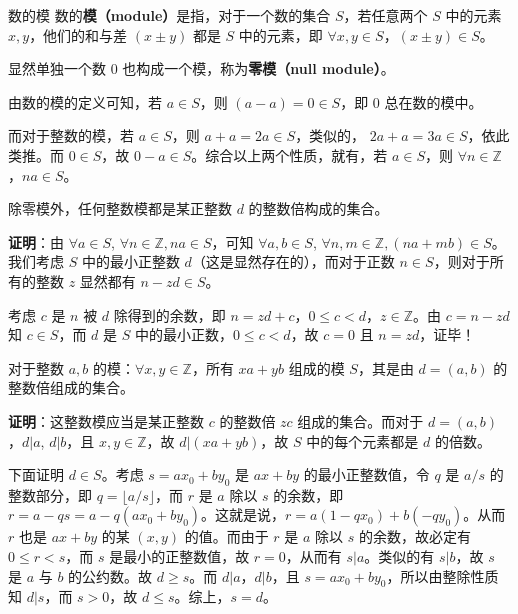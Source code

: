 \begin{definition}{数的模}
数的\textbf{模（module）}是指，对于一个数的集合 $S$，若任意两个 $S$ 中的元素 $x, y$，他们的和与差 $(x\pm y)$ 都是 $S$ 中的元素，即 $\forall x, y \in S$，$(x \pm y) \in S$。
\end{definition}
显然单独一个数 $0$ 也构成一个模，称为\textbf{零模（null module）}。

由数的模的定义可知，若 $a \in S$，则 $(a-a)=0 \in S$，即 $0$ 总在数的模中。

而对于整数的模，若 $a \in S$，则 $a + a = 2a\in S$，类似的， $2a + a = 3a\in S$，依此类推。而 $0 \in S$，故 $0 - a \in S$。综合以上两个性质，就有，若 $a \in S$，则 $\forall n \in \mathbb Z$，$na \in S$。

\begin{theorem}{}
除零模外，任何整数模都是某正整数 $d$ 的整数倍构成的集合。
\end{theorem}
\textbf{证明}：由 $\forall a \in S$, $\forall n \in \mathbb Z, na \in S$，可知 $\forall a, b \in S$, $\forall n, m \in \mathbb Z, (na+mb) \in S$。我们考虑 $S$ 中的最小正整数 $d$（这是显然存在的），而对于正数 $n \in S$，则对于所有的整数 $z$ 显然都有 $n - zd \in S$。

考虑 $c$ 是 $n$ 被 $d$ 除得到的余数，即 $n = zd + c$，$0 \le c < d$，$z \in \mathbb Z$。由 $c = n - zd$ 知 $c \in S$，而 $d$ 是 $S$ 中的最小正数，$0 \le c < d$，故 $c = 0$ 且 $n = zd$，证毕！

\begin{theorem}{}
对于整数 $a, b$ 的模：$\forall x, y \in \mathbb Z$，所有 $xa+yb$ 组成的模 $S$，其是由 $d=(a, b)$ 的整数倍组成的集合。
\end{theorem}
\textbf{证明}：这整数模应当是某正整数 $c$ 的整数倍 $zc$ 组成的集合。而对于 $d = (a, b)$，$d | a$, $d | b$，且 $x, y \in \mathbb Z$，故 $d | (xa+yb)$，故 $S$ 中的每个元素都是 $d$ 的倍数。

下面证明 $d \in S$。考虑 $s=a x_0 + b y_0$ 是 $ax+by$ 的最小正整数值，令 $q$ 是 $a/s$ 的整数部分，即 $q = \lfloor a/s \rfloor$，而 $r$ 是 $a$ 除以 $s$ 的余数，即 $r = a - q s = a - q(a x_0 + b y_0)$。这就是说，$r = a(1-q x_0) + b(-q y_0)$。从而 $r$ 也是 $ax+by$ 的某 $(x, y)$ 的值。而由于 $r$ 是 $a$ 除以 $s$ 的余数，故必定有 $0 \le r < s$，而 $s$ 是最小的正整数值，故 $r=0$，从而有 $s | a$。类似的有 $s | b$，故 $s$ 是 $a$ 与 $b$ 的公约数。故 $d \ge s$。而 $d|a$，$d|b$，且 $s = ax_0 + by_0$，所以由整除性质知 $d|s$，而 $s > 0$，故 $d \le s$。综上，$s = d$。

